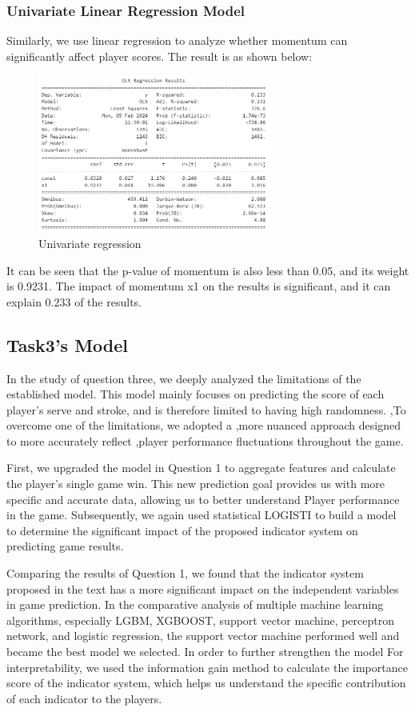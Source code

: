\documentclass{article}
\begin{document}
\subsubsection{Univariate Linear Regression Model}  
Similarly, we use linear regression to analyze whether momentum can significantly affect player scores. The result is as shown below:
\begin{figure}[H]
      \centering
      \includegraphics[width=0.7\textwidth]{Univariate_linear_regression.png}
      \caption{Univariate regression}
\end{figure}
It can be seen that the p-value of momentum is also less than 0.05, and its weight is 0.9231. The impact of momentum x1 on the results is significant, and it can explain 0.233 of the results.

\subsection{Task3's Model}
In the study of question three, we deeply analyzed the limitations of the established model. This model mainly focuses on predicting the score of each player's serve and stroke, and is therefore limited to having high randomness. ,To overcome one of the limitations, we adopted a ,more nuanced approach designed to more accurately reflect ,player performance fluctuations throughout the game.

First, we upgraded the model in Question 1 to aggregate features and calculate the player's single game win. This new prediction goal provides us with more specific and accurate data, allowing us to better understand Player performance in the game. Subsequently, we again used statistical LOGISTI to build a model to determine the significant impact of the proposed indicator system on predicting game results.

Comparing the results of Question 1, we found that the indicator system proposed in the text has a more significant impact on the independent variables in game prediction. In the comparative analysis of multiple machine learning algorithms, especially LGBM, XGBOOST, support vector machine, perceptron network, and logistic regression, the support vector machine performed well and became the best model we selected. In order to further strengthen the model For interpretability, we used the information gain method to calculate the importance score of the indicator system, which helps us understand the specific contribution of each indicator to the players.
\end{document}
